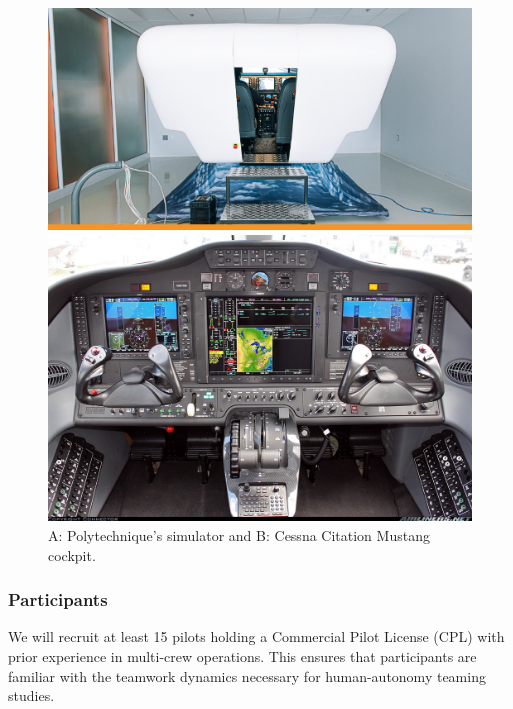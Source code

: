 \documentclass[12pt,a4paper]{article} %
\begin{document}
	\begin{figure}[H]
		\centering
		\begin{minipage}[b]{0.50\textwidth} %
			\centering
			\includegraphics[width=\textwidth]{images/poly_simu.png}
		\end{minipage}
		\hfill %
		\begin{minipage}[b]{0.45\textwidth} %
			\centering
			\includegraphics[width=\textwidth]{images/mustang_cockpit.jpg}
		\end{minipage}
		\caption{A: Polytechnique's simulator and B: Cessna Citation Mustang cockpit.}
		\label{fig:simu_cockpit}
	\end{figure}
	

	\subsubsection{Participants}
	We will recruit at least 15 pilots holding a Commercial Pilot License (CPL) with prior experience in multi-crew operations. This ensures that participants are familiar with the teamwork dynamics necessary for human-autonomy teaming studies.
\end{document}
